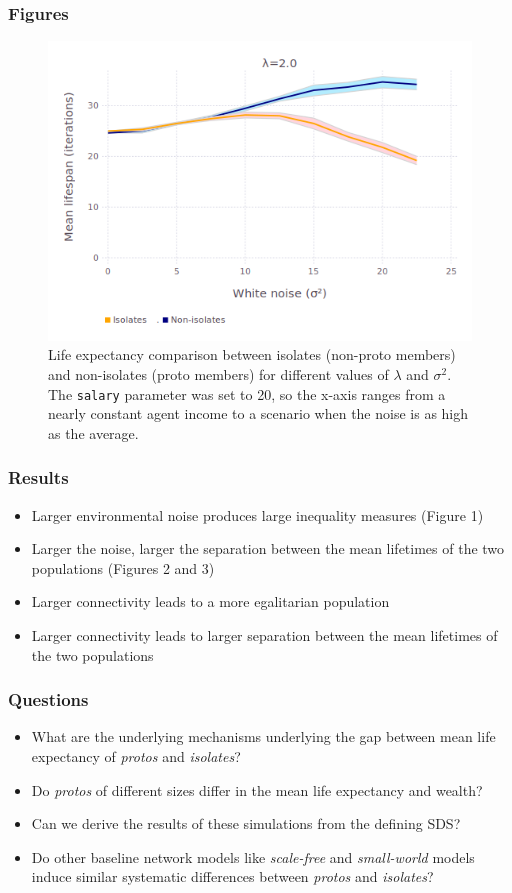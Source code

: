 \documentclass{beamer}
\begin{document}
\begin{frame}[t]
\frametitle{Figures}
\begin{figure}[ht]
\centering
\includegraphics[scale=.4]{figures/avgLifespanLambda2.png}
\caption{Life expectancy comparison between isolates (non-proto members) and
non-isolates (proto members) for different values of $\lambda$ and $\sigma^2$.
The \texttt{salary} parameter was set to 20, so the x-axis ranges from a nearly
constant agent income to a scenario when the noise is as high as the average.}
\label{fig:avgLifespanLambda}
\end{figure}
\end{frame}

\begin{frame}[t]
\frametitle{Results}
\begin{itemize}
\item Larger environmental noise produces large inequality measures (Figure 1)
\item Larger the noise, larger the separation between the mean lifetimes of the two populations (Figures 2 and 3) 
\item Larger connectivity leads to a more egalitarian population
\item Larger connectivity leads to larger separation between the mean lifetimes of the two populations
\end{itemize}

\end{frame}

\begin{frame}[t]
\frametitle{Questions}
\begin{itemize}
\item What are the underlying mechanisms underlying the gap between mean life expectancy of \textit{protos} and \textit{isolates}?
\item Do \textit{protos} of different sizes differ in the mean life expectancy and wealth? 
\item Can we derive the results of these simulations from the defining SDS?
\item Do other baseline network models like \textit{scale-free} and \textit{small-world} models induce similar systematic differences between \textit{protos} and \textit{isolates}?
\end{itemize}
\end{frame}
\end{document}
